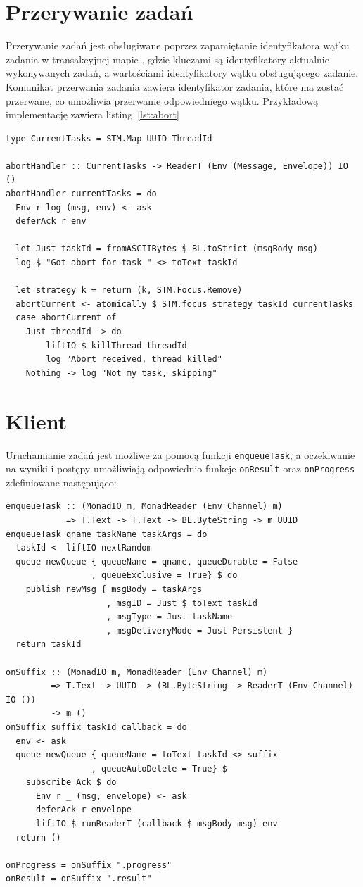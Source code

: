 \section{Przerywanie zadań}
\label{sec:przer}
Przerywanie zadań jest obsługiwane poprzez zapamiętanie identyfikatora wątku zadania w transakcyjnej mapie \cite{STMMap}, gdzie kluczami są identyfikatory aktualnie wykonywanych zadań, a wartościami identyfikatory wątku obsługującego zadanie. Komunikat przerwania zadania zawiera identyfikator zadania, które ma zostać przerwane, co umożliwia przerwanie odpowiedniego wątku. Przykładową implementację zawiera listing~\ref{lst:abort}
\begin{lstlisting}[caption=Przerywanie zadań, label=lst:abort]
type CurrentTasks = STM.Map UUID ThreadId

abortHandler :: CurrentTasks -> ReaderT (Env (Message, Envelope)) IO ()
abortHandler currentTasks = do
  Env r log (msg, env) <- ask
  deferAck r env

  let Just taskId = fromASCIIBytes $ BL.toStrict (msgBody msg)
  log $ "Got abort for task " <> toText taskId

  let strategy k = return (k, STM.Focus.Remove)
  abortCurrent <- atomically $ STM.focus strategy taskId currentTasks
  case abortCurrent of
    Just threadId -> do
        liftIO $ killThread threadId
        log "Abort received, thread killed"
    Nothing -> log "Not my task, skipping"
\end{lstlisting}
\newpage
\section{Klient}
Uruchamianie zadań jest możliwe za pomocą funkcji \lstinline{enqueueTask}, a oczekiwanie na wyniki i postępy umożliwiają odpowiednio funkcje \lstinline{onResult} oraz \lstinline{onProgress} zdefiniowane następująco:

\begin{lstlisting}[caption=Klient uruchamiający zadania]
enqueueTask :: (MonadIO m, MonadReader (Env Channel) m) 
            => T.Text -> T.Text -> BL.ByteString -> m UUID
enqueueTask qname taskName taskArgs = do
  taskId <- liftIO nextRandom
  queue newQueue { queueName = qname, queueDurable = False
                 , queueExclusive = True} $ do
    publish newMsg { msgBody = taskArgs
                    , msgID = Just $ toText taskId
                    , msgType = Just taskName
                    , msgDeliveryMode = Just Persistent }
  return taskId

onSuffix :: (MonadIO m, MonadReader (Env Channel) m) 
         => T.Text -> UUID -> (BL.ByteString -> ReaderT (Env Channel) IO ()) 
         -> m () 
onSuffix suffix taskId callback = do
  env <- ask
  queue newQueue { queueName = toText taskId <> suffix
                 , queueAutoDelete = True} $
    subscribe Ack $ do
      Env r _ (msg, envelope) <- ask
      deferAck r envelope
      liftIO $ runReaderT (callback $ msgBody msg) env
  return ()

onProgress = onSuffix ".progress"
onResult = onSuffix ".result"

\end{lstlisting}

